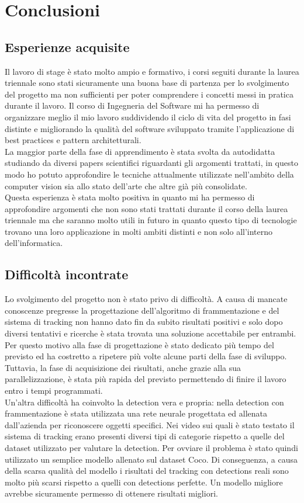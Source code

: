 \section{Conclusioni}

\subsection{Esperienze acquisite}
Il lavoro di stage è stato molto ampio e formativo, i corsi seguiti durante la laurea triennale sono stati sicuramente una buona base di partenza per lo svolgimento del progetto ma non sufficienti per poter comprendere i concetti messi in pratica durante il lavoro. Il corso di Ingegneria del Software mi ha permesso di organizzare meglio il mio lavoro suddividendo il ciclo di vita del progetto in fasi distinte e migliorando la qualità del software sviluppato tramite l'applicazione di best practices e pattern architetturali.\\
La maggior parte della fase di apprendimento è stata svolta da autodidatta studiando da diversi papers scientifici riguardanti gli argomenti trattati, in questo modo ho potuto approfondire le tecniche attualmente utilizzate nell'ambito della computer vision sia allo stato dell'arte che altre già più consolidate.\\
Questa esperienza è stata molto positiva in quanto mi ha permesso di approfondire argomenti che non sono stati trattati durante il corso della laurea triennale ma che saranno molto utili in futuro in quanto questo tipo di tecnologie trovano una loro applicazione in molti ambiti distinti e non solo all'interno dell'informatica.

\subsection{Difficoltà incontrate}
Lo svolgimento del progetto non è stato privo di difficoltà. A causa di mancate conoscenze pregresse la progettazione dell'algoritmo di frammentazione e del sistema di tracking non hanno dato fin da subito risultati positivi e solo dopo diversi tentativi e ricerche è stata trovata una soluzione accettabile per entrambi. Per questo motivo alla fase di progettazione è stato dedicato più tempo del previsto ed ha costretto a ripetere più volte alcune parti della fase di sviluppo. Tuttavia, la fase di acquisizione dei risultati, anche grazie alla sua parallelizzazione, è stata più rapida del previsto permettendo di finire il lavoro entro i tempi programmati.\\
Un'altra difficoltà ha coinvolto la detection vera e propria: nella detection con frammentazione è stata utilizzata una rete neurale progettata ed allenata dall'azienda per riconoscere oggetti specifici. Nei video sui quali è stato testato il sistema di tracking erano presenti diversi tipi di categorie rispetto a quelle del dataset utilizzato per valutare la detection. Per ovviare il problema è stato quindi utilizzato un semplice modello allenato sul dataset Coco. Di conseguenza, a causa della scarsa qualità del modello i risultati del tracking con detections reali sono molto più scarsi rispetto a quelli con detections perfette. Un modello migliore avrebbe sicuramente permesso di ottenere risultati migliori. 